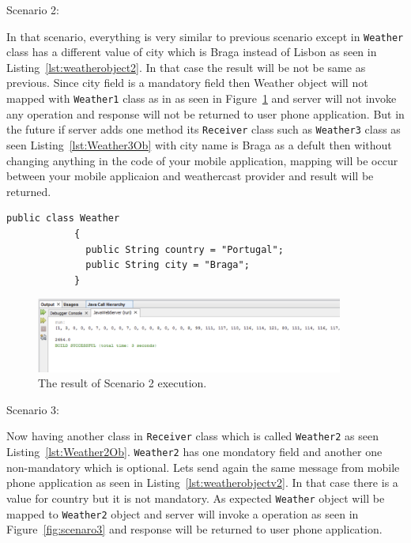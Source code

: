 Scenario 2:

In that scenario, everything is very similar to previous scenario except in {\tt Weather} class has a different value of city which is Braga instead of Lisbon as seen in Listing~\ref{lst:weatherobject2}. In that case the result will be not be same as previous. Since city field is a mandatory field then Weather object will not mapped with {\tt Weather1} class as in as seen in Figure~\ref{fig:scenaro2} and server will not invoke any operation and response will not be returned to user phone application. But in the future if server adds one method its {\tt Receiver} class such as {\tt Weather3} class as seen Listing~\ref{lst:Weather3Ob} with city name is Braga as a defult then without changing anything in the code of your mobile application, mapping will be occur between your mobile applicaion and weathercast provider and result will be returned.

\begin{lstlisting}[caption=Simple weather object class, label=lst:weatherobject2]
          public class Weather
            {
              public String country = "Portugal";
              public String city = "Braga";
            }
\end{lstlisting}

\begin{figure}[!htb]
  \centering
  \includegraphics[width=0.9\textwidth]{Figures/scenari2.png}
  \caption[The result of Scenario 2 execution.]{The result of Scenario 2 execution.}
  \label{fig:scenaro2}
\end{figure}

Scenario 3:

Now having another class in {\tt Receiver} class which is called {\tt Weather2} as seen Listing~\ref{lst:Weather2Ob}. {\tt Weather2} has one mondatory field and another one non-mandatory which is optional. Lets send again the same message from mobile phone application as seen in Listing~\ref{lst:weatherobjectv2}. In that case there is a value for country but it is not mandatory. As expected {\tt Weather} object will be mapped to {\tt Weather2} object and server will invoke a operation as seen in Figure~\ref{fig:scenaro3} and response will be returned to user phone application.


